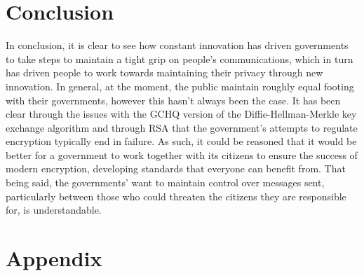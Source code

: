 \documentclass[a4paper,12pt]{report}
\begin{document}
  \section{Conclusion}
In conclusion, it is clear to see how constant innovation has driven governments
to take steps to maintain a tight grip on people's communications, which in turn
has driven people to work towards maintaining their privacy through new
innovation. In general, at the moment, the public maintain roughly equal footing
with their governments, however this hasn't always been the case. It has been
clear through the issues with the GCHQ version of the Diffie-Hellman-Merkle key
exchange algorithm and through RSA that the government's attempts to regulate
encryption typically end in failure. As such, it could be reasoned that it would
be better for a government to work together with its citizens to ensure the
success of modern encryption, developing standards that everyone can benefit
from. That being said, the governments' want to maintain control over messages
sent, particularly between those who could threaten the citizens they are
responsible for, is understandable.

  \newpage
  \section{Appendix}
    \begin{appendix}
    
      \nocite{*}
      
    \end{appendix}
\end{document}
